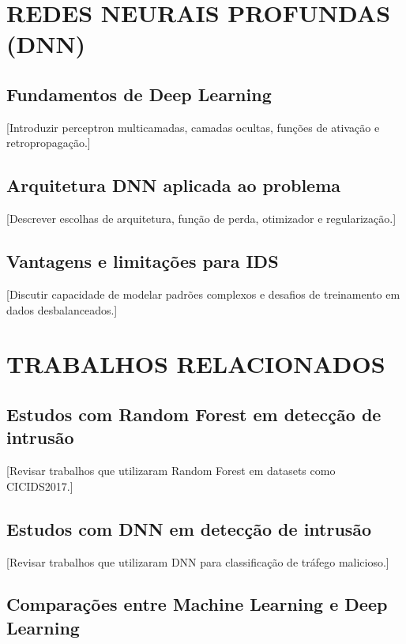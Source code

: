 \documentclass[12pt,oneside]{abntex2}
\begin{document}
\chapter{REDES NEURAIS PROFUNDAS (DNN)}

\section{Fundamentos de Deep Learning}

[Introduzir perceptron multicamadas, camadas ocultas, funções de ativação e retropropagação.]

\section{Arquitetura DNN aplicada ao problema}

[Descrever escolhas de arquitetura, função de perda, otimizador e regularização.]

\section{Vantagens e limitações para IDS}

[Discutir capacidade de modelar padrões complexos e desafios de treinamento em dados desbalanceados.]

\chapter{TRABALHOS RELACIONADOS}

\section{Estudos com Random Forest em detecção de intrusão}

[Revisar trabalhos que utilizaram Random Forest em datasets como CICIDS2017.]

\section{Estudos com DNN em detecção de intrusão}

[Revisar trabalhos que utilizaram DNN para classificação de tráfego malicioso.]

\section{Comparações entre Machine Learning e Deep Learning}
\end{document}
